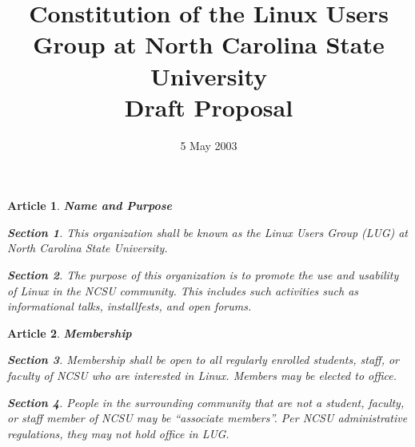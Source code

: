 \documentclass [letterpaper, 12pt]{article}
\newtheorem{art}{Article}
\newtheorem{sect}{Section}[art]
\begin{document}
\title{
Constitution of the Linux Users Group at North Carolina State University\\
\medskip \large Draft Proposal}
 
\date{5 May 2003}
\maketitle

\begin{art} {\bf Name and Purpose}
\label{art-name}

\begin{sect}
This organization shall be known as the Linux Users Group (LUG) at North Carolina State University.
\end{sect}

\begin{sect}
The purpose of this organization is to promote the use and usability of Linux
in the NCSU community.  This includes such activities such as informational talks, installfests, and open forums.
\end{sect}

\end{art}

\bigskip
\begin{art} {\bf Membership}
\label{art-memb}

\begin{sect}
Membership shall be open to all regularly enrolled students, staff, or faculty of NCSU who are interested in Linux.  Members may be elected to office.
\end{sect}

\begin{sect}
People in the surrounding community that are not a student, faculty,
or staff member of NCSU may be ``associate members''.  Per NCSU administrative regulations, they may not hold office in LUG.
\end{sect}

\end{art}
\end{document}
